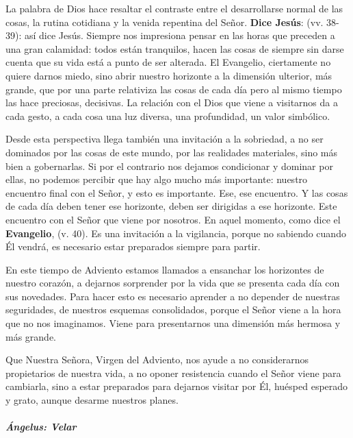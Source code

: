 La palabra de Dios hace resaltar el contraste entre el desarrollarse normal de las cosas, la rutina cotidiana y la venida repentina del Señor. \textbf{Dice Jesús}:  (vv. 38-39): así dice Jesús. Siempre nos impresiona pensar en las horas que preceden a una gran calamidad: todos están tranquilos, hacen las cosas de siempre sin darse cuenta que su vida está a punto de ser alterada. El Evangelio, ciertamente no quiere darnos miedo, sino abrir nuestro horizonte a la dimensión ulterior, más grande, que por una parte relativiza las cosas de cada día pero al mismo tiempo las hace preciosas, decisivas. La relación con el Dios que viene a visitarnos da a cada gesto, a cada cosa una luz diversa, una profundidad, un valor simbólico.

Desde esta perspectiva llega también una invitación a la sobriedad, a no ser dominados por las cosas de este mundo, por las realidades materiales, sino más bien a gobernarlas. Si por el contrario nos dejamos condicionar y dominar por ellas, no podemos percibir que hay algo mucho más importante: nuestro encuentro final con el Señor, y esto es importante. Ese, ese encuentro. Y las cosas de cada día deben tener ese horizonte, deben ser dirigidas a ese horizonte. Este encuentro con el Señor que viene por nosotros. En aquel momento, como dice el \textbf{Evangelio},  (v. 40). Es una invitación a la vigilancia, porque no sabiendo cuando Él vendrá, es necesario estar preparados siempre para partir.

En este tiempo de Adviento estamos llamados a ensanchar los horizontes de nuestro corazón, a dejarnos sorprender por la vida que se presenta cada día con sus novedades. Para hacer esto es necesario aprender a no depender de nuestras seguridades, de nuestros esquemas consolidados, porque el Señor viene a la hora que no nos imaginamos. Viene para presentarnos una dimensión más hermosa y más grande.

Que Nuestra Señora, Virgen del Adviento, nos ayude a no considerarnos propietarios de nuestra vida, a no oponer resistencia cuando el Señor viene para cambiarla, sino a estar preparados para dejarnos visitar por Él, huésped esperado y grato, aunque desarme nuestros planes.

\subparagraph{Ángelus: Velar}\label{uxe1ngelus-velar}

